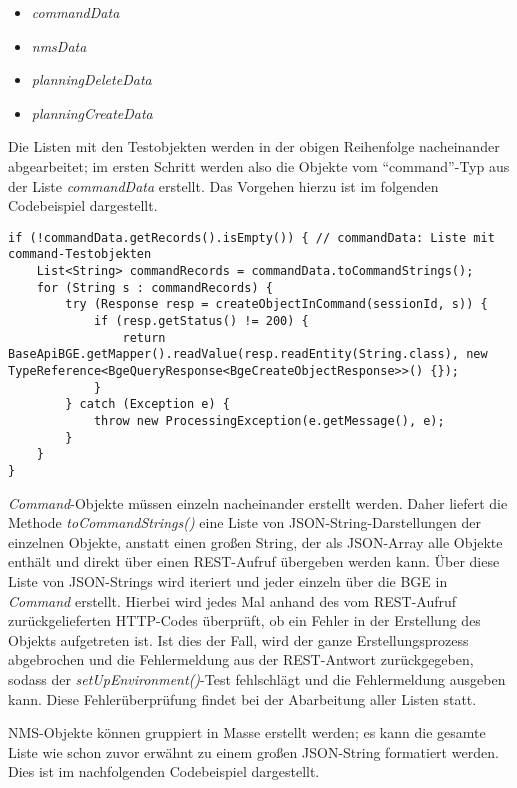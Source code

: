 \begin{itemize}
    \item \textit{commandData}
    \item \textit{nmsData}
    \item \textit{planningDeleteData}
    \item \textit{planningCreateData}
\end{itemize}

Die Listen mit den Testobjekten werden in der obigen Reihenfolge nacheinander abgearbeitet; im ersten Schritt werden also die Objekte vom \enquote{command}-Typ aus der Liste \textit{commandData} erstellt. Das Vorgehen hierzu ist im folgenden Codebeispiel dargestellt.

\begin{lstlisting}[caption=Erstellen von \textit{Command}-Objekten über die BGE, label=createCommandTestObjects,style=Javastyle]
if (!commandData.getRecords().isEmpty()) { // commandData: Liste mit command-Testobjekten
    List<String> commandRecords = commandData.toCommandStrings();
    for (String s : commandRecords) {
        try (Response resp = createObjectInCommand(sessionId, s)) {
            if (resp.getStatus() != 200) {
                return BaseApiBGE.getMapper().readValue(resp.readEntity(String.class), new TypeReference<BgeQueryResponse<BgeCreateObjectResponse>>() {});
            }
        } catch (Exception e) {
            throw new ProcessingException(e.getMessage(), e);
        }
    }
}
\end{lstlisting}

\textit{Command}-Objekte müssen einzeln nacheinander erstellt werden. Daher liefert die Methode \textit{toCommandStrings()} eine Liste von \ac{JSON}-String-Darstellungen der einzelnen Objekte, anstatt einen großen String, der als \ac{JSON}-Array alle Objekte enthält und direkt über einen \ac{REST}-Aufruf übergeben werden kann. Über diese Liste von \ac{JSON}-Strings wird iteriert und jeder einzeln über die \ac{BGE} in \textit{Command} erstellt. Hierbei wird jedes Mal anhand des vom \ac{REST}-Aufruf zurückgelieferten \ac{HTTP}-Codes überprüft, ob ein Fehler in der Erstellung des Objekts aufgetreten ist. Ist dies der Fall, wird der ganze Erstellungsprozess abgebrochen und die Fehlermeldung aus der \ac{REST}-Antwort zurückgegeben, sodass der \textit{setUpEnvironment()}-Test fehlschlägt und die Fehlermeldung ausgeben kann. Diese Fehlerüberprüfung findet bei der Abarbeitung aller Listen statt.

\ac{NMS}-Objekte können gruppiert in Masse erstellt werden; es kann die gesamte Liste wie schon zuvor erwähnt zu einem großen \ac{JSON}-String formatiert werden. Dies ist im nachfolgenden Codebeispiel dargestellt.

